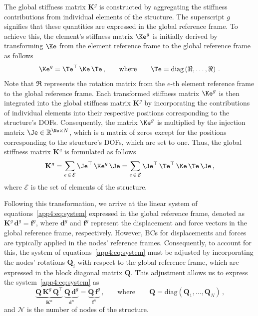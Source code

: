 The global stiffness matrix $\mathbf{K}^{g}$ is constructed by aggregating the stiffness contributions from individual elements of the structure. The superscript $g$ signifies that these quantities are expressed in the global reference frame. To achieve this, the element's stiffness matrix $\Ke^{g}$ is initially derived by transforming $\Ke$ from the element reference frame to the global reference frame as follows
%
\begin{equation}
  \label{app4:eq:element_stiffness_matrix}
  \Ke^{g} = \Te^\top \, \Ke \, \Te \, \text{,} \qquad \text{where} \qquad \Te = \mathrm{diag}\left( \Re, \dots, \Re \right) \, \text{.}
\end{equation}
%
Note that $\Re$ represents the rotation matrix from the $e$-th element reference frame to the global reference frame. Each transformed stiffness matrix $\Ke^{g}$ is then integrated into the global stiffness matrix $\mathbf{K}^{g}$ by incorporating the contributions of individual elements into their respective positions corresponding to the structure's \acp{DOF}. Consequently, the matrix $\Ke^{g}$ is multiplied by the injection matrix $\Je \in \mathbb{R}^{\Ne \times N}$, which is a matrix of zeros except for the positions corresponding to the structure's \acp{DOF}, which are set to one. Thus, the global stiffness matrix $\mathbf{K}^{g}$ is formulated as follows
%
\begin{equation}
  \mathbf{K}^{g} = \sum_{e \, \in \, \mathcal{E}} \Je^\top \, \Ke^{g} \, \Je
   = \sum_{e \, \in \, \mathcal{E}} \Je^\top \, \Te^\top\,\Ke \, \Te \, \Je \, \text{,}
\end{equation}
%
where $\mathcal{E}$ is the set of elements of the structure.

Following this transformation, we arrive at the linear system of equations~\eqref{app4:eq:system} expressed in the global reference frame, denoted as $\mathbf{K}^{g} \, \mathbf{d}^{g} = \mathbf{f}^{g}$, where $\mathbf{d}^{g}$ and $\mathbf{f}^{g}$ represent the displacement and force vectors in the global reference frame, respectively. However, \acp{BC} for displacements and forces are typically applied in the nodes' reference frames. Consequently, to account for this, the system of equations~\eqref{app4:eq:system} must be adjusted by incorporating the nodes' rotations $\mathbf{Q}_{i}$ with respect to the global reference frame, which are expressed in the block diagonal matrix $\mathbf{Q}$. This adjustment allows us to express the system~\eqref{app4:eq:system} as
%
\begin{equation}
  \underbrace{\mathbf{Q} \, \mathbf{K}^{g} \, \mathbf{Q}^\top}_{\displaystyle\mathbf{K}^{n}} \, \underbrace{\mathbf{Q} \, \mathbf{d}^{g}}_{\displaystyle\mathbf{d}^{n}} = \underbrace{\mathbf{Q} \, \mathbf{f}^{g}}_{\displaystyle\mathbf{f}^{n}} \, \text{,} \qquad \text{where} \qquad \mathbf{Q} = \mathrm{diag}\left( \mathbf{Q}_{1}, \dots, \mathbf{Q}_{N} \right) \, \text{,}
\end{equation}
%
and $\mathcal{N}$ is the number of nodes of the structure.

